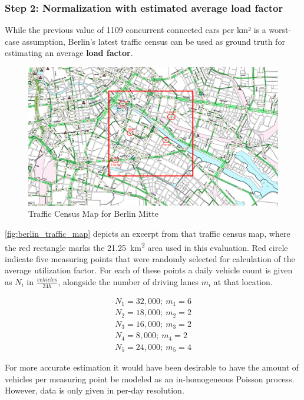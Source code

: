 \subsubsection{Step 2: Normalization with estimated average load factor}
While the previous value of 1109 concurrent connected cars per km² is a worst-case assumption, Berlin's latest traffic census \cite{VerkehrslenkungBerlinVLB2014} can be used as ground truth for estimating an average \textbf{load factor}. 

\begin{figure}[H]
	\centering
	\includegraphics[width=1.0\linewidth]{98_images/berlin_traffic_map_2}
	\caption{Traffic Census Map for Berlin Mitte \cite{VerkehrslenkungBerlinVLB2014}}
	\label{fig:berlin_traffic_map}
\end{figure}

\autoref{fig:berlin_traffic_map} depicts an excerpt from that traffic census map, where the red rectangle marks the \SI{21.25}{\square\km} area used in this evaluation. Red circle indicate five measuring points that were randomly selected for calculation of the average utilization factor. For each of these points a daily vehicle count is given as $N_{i}$ in $\frac{vehicles}{24 h}$, alongside the number of driving lanes $m_i$ at that location.

\begin{gather*}
N_1 = 32,000; \  m_1 = 6 \\
N_2 = 18,000; \  m_2 = 2 \\
N_3 = 16,000; \  m_3 = 2 \\
N_4 = 8,000; \  m_4 = 2 \\
N_5 = 24,000; \  m_5 = 4
\end{gather*}

For more accurate estimation it would have been desirable to have the amount of vehicles per measuring point be modeled as an in-homogeneous Poisson process. However, data is only given in per-day resolution. 

